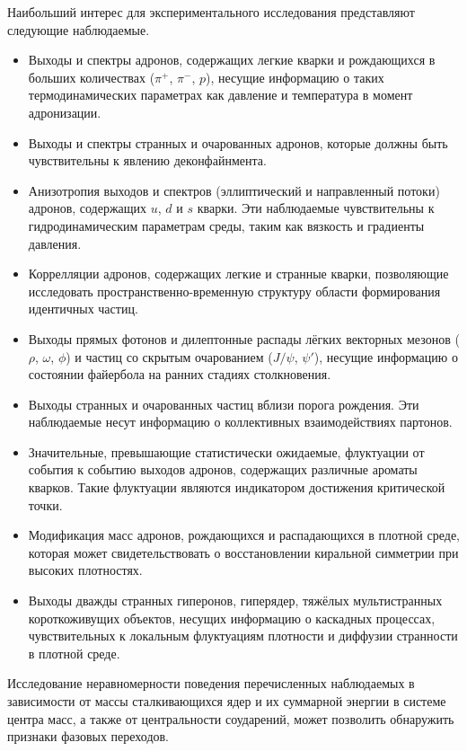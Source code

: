 Наибольший интерес для экспериментального исследования представляют следующие наблюдаемые.

\begin{itemize}
\item Выходы и спектры адронов, содержащих легкие кварки и рождающихся в больших количествах ($\pi^{+}$, $\pi^{-}$, $p$), несущие информацию о таких термодинамических параметрах как давление и температура в момент адронизации.
\item Выходы и спектры странных и очарованных адронов, которые должны быть чувствительны к явлению деконфайнмента.
\item Анизотропия выходов и спектров (эллиптический и направленный потоки) адронов, содержащих $u$, $d$ и $s$ кварки. Эти наблюдаемые чувствительны к гидродинамическим параметрам среды, таким как вязкость и градиенты давления.
\item Коррелляции адронов, содержащих легкие и странные кварки, позволяющие исследовать пространственно-временную структуру области формирования идентичных частиц.
\item Выходы прямых фотонов и дилептонные распады лёгких векторных мезонов ($\rho$, $\omega$, $\phi$) и частиц со скрытым очарованием ($J/\psi$, $\psi'$), несущие информацию о состоянии файербола на ранних стадиях столкновения.
\item Выходы странных и очарованных частиц вблизи порога рождения. Эти наблюдаемые несут информацию о коллективных взаимодействиях партонов.
\item Значительные, превышающие статистически ожидаемые, флуктуации от события к событию выходов адронов, содержащих различные ароматы кварков. Такие флуктуации являются индикатором достижения критической точки.
\item Модификация масс адронов, рождающихся и распадающихся в плотной среде, которая может свидетельствовать о восстановлении киральной симметрии при высоких плотностях.
\item Выходы дважды странных гиперонов, гиперядер, тяжёлых мультистранных короткоживущих объектов, несущих информацию о каскадных процессах, чувствительных к локальным флуктуациям плотности и диффузии странности в плотной среде.
\end{itemize}


Исследование неравномерности поведения перечисленных наблюдаемых в зависимости от массы сталкивающихся ядер и их суммарной энергии в системе центра масс, а также от центральности соударений, может позволить обнаружить признаки фазовых переходов.


